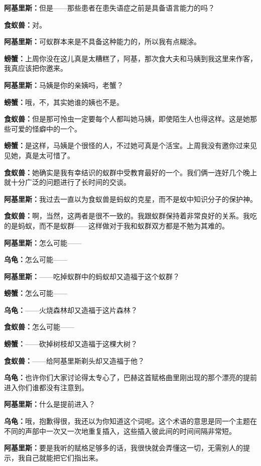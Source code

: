 \documentclass[
  12pt,
  twoside,
  openright,
  oldfontcommands,
]{memoir}
\newcommand{\dialogname}[1]{{\heifamily\bfseries #1}}
\begin{document}
\dialogname{阿基里斯：}但是------那些患者在患失语症之前是具备语言能力的吗？

\dialogname{食蚁兽：}对。

\dialogname{阿基里斯：}可蚁群本来是不具备这种能力的，所以我有点糊涂。

\dialogname{螃蟹：}上周你没在这儿真是太糟糕了，阿基，那次食大夫和马姨到我这里来作客，我真应该把你邀来。

\dialogname{阿基里斯：}马姨是你的亲姨吗，老蟹？

\dialogname{螃蟹：}哦，不，其实她谁的姨也不是。

\dialogname{食蚁兽：}但是那可怜虫一定要每个人都叫她马姨，即使陌生人也得这样。这是她那些可爱的怪癖中的一个。

\dialogname{螃蟹：}是这样，马姨是个很怪的人，不过她可真是个活宝。上周我没有邀你过来见见她，真是太可惜了。

\dialogname{食蚁兽：}她确实是我有幸结识的蚁群中受教育最好的一个。我们俩一连好几个晚上就十分广泛的问题进行了长时间的交谈。

\dialogname{阿基里斯：}我过去一直以为食蚁兽是蚂蚁的克星，而不是蚁中知识分子的保护神。

\dialogname{食蚁兽：}啊，当然，这两者是很不一致的。我跟蚁群保持着非常良好的关系。我吃的是蚂蚁，而不是蚁群------这样做对于我和蚁群双方都是不勉为其难的。

\dialogname{阿基里斯：}怎么可能------

\dialogname{乌龟：}怎么可能------

\dialogname{阿基里斯：}------吃掉蚁群中的蚂蚁却又造福于这个蚁群？

\dialogname{螃蟹：}怎么可能------

\dialogname{乌龟：}------火烧森林却又造福于这片森林？

\dialogname{食蚁兽：}怎么可能------

\dialogname{螃蟹：}------砍掉树枝却又造福于这棵大树？

\dialogname{食蚁兽：}------给阿基里斯剃头却又造福于他？

\dialogname{乌龟：}也许你们大家讨论得太专心了，巴赫这首赋格曲里刚出现的那个漂亮的提前进入你们谁都没有注意到。

\dialogname{阿基里斯：}什么是提前进入？

\dialogname{乌龟：}哦，抱歉得很，我还以为你知道这个词呢。这个术语的意思是同一个主题在不同的声部中一次又一次地重复插入，这些插入彼此间的时间间隔非常短。

\dialogname{阿基里斯：}要是我听的赋格足够多的话，我很快就会弄懂这一切，无需别人的提示，我自己就能把它们指出来。
\end{document}
